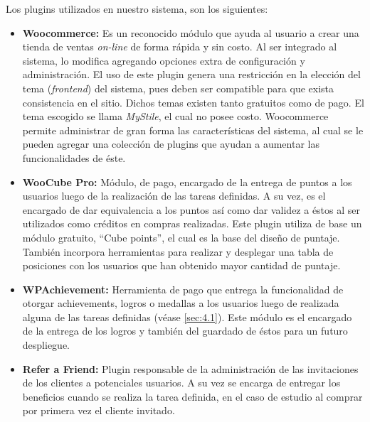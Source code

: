 Los plugins utilizados en nuestro sistema, son los siguientes:

\begin{itemize}

    \item {\bf Woocommerce:}
        Es un reconocido módulo que ayuda al usuario a crear una tienda de
        ventas \emph{on-line} de forma rápida y sin costo.
        Al ser integrado al sistema, lo modifica agregando opciones
        extra de configuración y administración.
        El uso de este plugin genera una restricción en la elección
        del tema (\emph{frontend}) del sistema, pues deben ser compatible
        para que exista consistencia en el sitio.
        Dichos temas existen tanto gratuitos como de pago.
        El tema escogido se llama \emph{MyStile}, el cual no posee costo.
        Woocommerce permite administrar de gran forma las características del
        sistema, al cual se le pueden agregar una colección de plugins que ayudan a
        aumentar las funcionalidades de éste.

    \item {\bf WooCube Pro:}
        Módulo, de pago, encargado de la entrega de puntos a los usuarios luego de
        la realización de las tareas definidas.
        A su vez, es el encargado de dar equivalencia a los puntos así como dar
        validez a éstos al ser utilizados como créditos en compras realizadas.
        Este plugin utiliza de base un módulo gratuito, ``Cube points'',
        el cual es la base del diseño de puntaje.
        También incorpora herramientas para realizar y desplegar una tabla
        de posiciones con los usuarios que han obtenido mayor cantidad de puntaje.

    \item {\bf WPAchievement:}
        Herramienta de pago que entrega la funcionalidad de otorgar achievements,
        logros o medallas a los usuarios luego de realizada alguna de las tareas
        definidas (véase \ref{sec:4.1}).
        Este módulo es el encargado de la entrega de los logros y también del
        guardado de éstos para un futuro despliegue.

    \item {\bf Refer a Friend:}
        Plugin responsable de la administración de las invitaciones de los
        clientes a potenciales usuarios.
        A su vez se encarga de entregar los beneficios cuando se realiza la tarea
        definida, en el caso de estudio al comprar por primera vez el cliente
        invitado.

\end{itemize}

